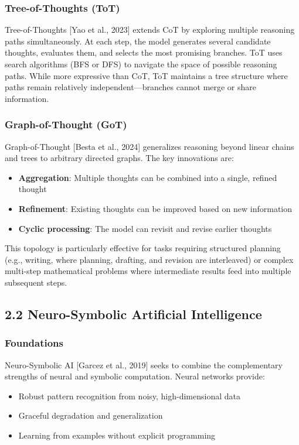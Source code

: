 \documentclass[11pt,a4paper]{article}
\begin{document}
\subsubsection{Tree-of-Thoughts (ToT)}

Tree-of-Thoughts [Yao et al., 2023] extends CoT by exploring multiple reasoning paths simultaneously. At each step, the model generates several candidate thoughts, evaluates them, and selects the most promising branches. ToT uses search algorithms (BFS or DFS) to navigate the space of possible reasoning paths. While more expressive than CoT, ToT maintains a tree structure where paths remain relatively independent—branches cannot merge or share information.

\subsubsection{Graph-of-Thought (GoT)}

Graph-of-Thought [Besta et al., 2024] generalizes reasoning beyond linear chains and trees to arbitrary directed graphs. The key innovations are:

\begin{itemize}
  \item \textbf{Aggregation}: Multiple thoughts can be combined into a single, refined thought
  \item \textbf{Refinement}: Existing thoughts can be improved based on new information
  \item \textbf{Cyclic processing}: The model can revisit and revise earlier thoughts
\end{itemize}

This topology is particularly effective for tasks requiring structured planning (e.g., writing, where planning, drafting, and revision are interleaved) or complex multi-step mathematical problems where intermediate results feed into multiple subsequent steps.

\subsection{2.2 Neuro-Symbolic Artificial Intelligence}

\subsubsection{Foundations}

Neuro-Symbolic AI [Garcez et al., 2019] seeks to combine the complementary strengths of neural and symbolic computation. Neural networks provide:
\begin{itemize}
  \item Robust pattern recognition from noisy, high-dimensional data
  \item Graceful degradation and generalization
  \item Learning from examples without explicit programming
\end{itemize}
\end{document}
